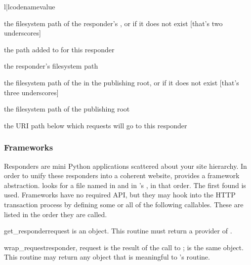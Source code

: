\begin{tableii}{l|l}{code}{name}{value}

\lineii{__}
    {the filesystem path of the responder's , or
     if it does not exist [that's two underscores]}

    {the path added to  for this responder}

    {the responder's filesystem path}

    {the filesystem path of the  in the publishing root,
    or  if it does not exist [that's three underscores]}

    {the filesystem path of the publishing root}

    {the URI path below which requests will go to this responder}

\end{tableii}



\subsubsection{Frameworks}

Responders are mini Python applications scattered about your site hierarchy. In
order to unify these responders into a coherent website, 
provides a framework abstraction.  looks for a file named
 in  and in 's , in
that order. The first found is used. Frameworks have no required API, but they
may hook into the HTTP transaction process by defining some or all of the
following callables. These are listed in the order they are called.

\begin{funcdesc}{get_responder}{request}
 is an  object. This routine must return
a provider of .
\end{funcdesc}

\begin{funcdesc}{wrap_request}{responder, request}
 is the result of the call to ;
 is the same  object. This routine may return any
object that is meaningful to 's  routine.
\end{funcdesc}


